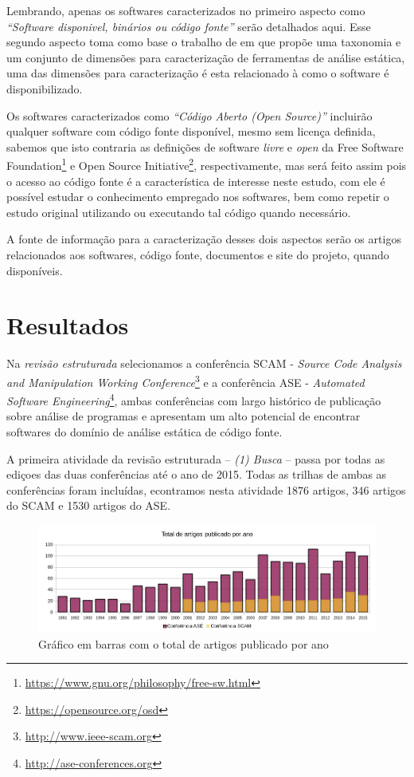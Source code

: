 Lembrando, apenas os softwares caracterizados no primeiro aspecto como
{\it``Software disponivel, binários ou código fonte''} serão detalhados aqui.
Esse segundo aspecto toma como base o trabalho de  em que
propõe uma taxonomia e um conjunto de dimensões para caracterização de
ferramentas de análise estática, uma das dimensões para caracterização
é esta relacionado à como o software é disponibilizado.

Os softwares caracterizados como {\it ``Código Aberto (Open Source)''}
incluirão qualquer software com código fonte disponível, mesmo sem licença
definida, sabemos que isto contraria as definições de software {\it livre} e
{\it open} da Free Software
Foundation\footnote{\url{https://www.gnu.org/philosophy/free-sw.html}} e Open
Source Initiative\footnote{\url{https://opensource.org/osd}}, respectivamente,
mas será feito assim pois o acesso ao código fonte é a característica de
interesse neste estudo, com ele é possível estudar o conhecimento empregado nos
softwares, bem como repetir o estudo original utilizando ou executando tal
código quando necessário.

A fonte de informação para a caracterização desses dois aspectos serão os
artigos relacionados aos softwares, código fonte, documentos e site do projeto,
quando disponíveis.

\section{Resultados}

Na {\it revisão estruturada} selecionamos a conferência SCAM - {\it
Source Code Analysis and Manipulation Working
Conference}\footnote{\url{http://www.ieee-scam.org}} e a conferência ASE - {\it
Automated Software Engineering}\footnote{\url{http://ase-conferences.org}},
ambas conferências com largo histórico de publicação sobre análise de
programas e apresentam um alto potencial de encontrar softwares do domínio de
análise estática de código fonte.

A primeira atividade da revisão estruturada -- {\it (1) Busca} -- passa por
todas as ediçoes das duas conferências até o ano de 2015. Todas as trilhas de
ambas as conferências foram incluídas, econtramos nesta atividade 1876 artigos,
346 artigos do SCAM e 1530 artigos do ASE.

\begin{figure}[h]
  \center
  \includegraphics[scale=0.65]{imagens/grafico-artigos-por-ano.png}
  \caption{Gráfico em barras com o total de artigos publicado por ano}
  \label{grafico-artigos-por-ano}
\end{figure}

